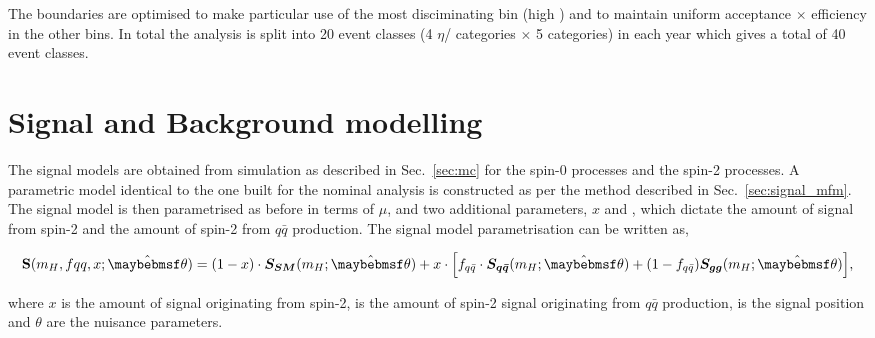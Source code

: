The \abscostheta boundaries are optimised to make particular use of the most disciminating 
bin (high \abscostheta) and to maintain uniform acceptance $\times$ efficiency in the 
other bins. In total the analysis is split into 20 event classes (4 $\eta$/\rnine\xspace 
categories $\times$ 5 \abscostheta categories) in each year which gives a total of 40 event classes.

\section{Signal and Background modelling}

The signal models are obtained from \MC simulation as described in Sec.~\ref{sec:mc} for the spin-0 \SM processes and the spin-2 processes. A parametric model identical to the one built for the nominal analysis is constructed as per the method described in Sec.~\ref{sec:signal_mfm}. The signal model is then parametrised as before in terms of $\mu$, \mH and two additional parameters, $x$ and \fqqbar, which dictate the amount of signal from spin-2 and the amount of spin-2 from $q\bar{q}$ production. The signal model parametrisation can be written as,

\begin{equation}
  \textbf{S}(m_{H},fqq,x;\hat{\theta}) = (1-x)\cdot\boldsymbol{S_{SM}}(m_{H};\hat{\theta})  + x\cdot\Bigl[f_{q\bar{q}}\cdot \boldsymbol{S_{q\bar{q}}}(m_{H};\hat{\theta}) + (1-f_{q\bar{q}})\boldsymbol{S_{gg}}(m_{H};\hat{\theta})\Bigr],  
  \label{eq:spin_sig}
\end{equation}

where $x$ is the amount of signal originating from spin-2, \fqqbar is the amount of spin-2 signal originating from $q\bar{q}$ production, \mH is the signal position and $\theta$ are the nuisance parameters.

